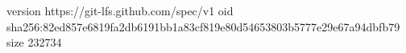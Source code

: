 version https://git-lfs.github.com/spec/v1
oid sha256:82ed857e6819fa2db6191bb1a83cf819e80d54653803b5777e29e67a94dbfb79
size 232734
